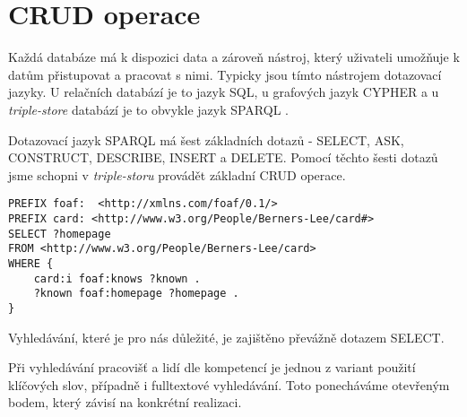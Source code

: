 \section{CRUD operace}
Každá databáze má k dispozici data a zároveň nástroj, který uživateli umožňuje k datům přistupovat a pracovat s nimi. Typicky jsou tímto nástrojem dotazovací jazyky. U relačních databází je to jazyk SQL, u grafových jazyk CYPHER a u \textit{triple-store} databází je to obvykle jazyk SPARQL \cite{SPARQL}.\par
Dotazovací jazyk SPARQL má šest základních dotazů - SELECT, ASK, CONSTRUCT, DESCRIBE, INSERT a DELETE. Pomocí těchto šesti dotazů jsme schopni v \textit{triple-storu} provádět základní CRUD operace.\par

\begin{lstlisting}[language=SPARQL, caption= Příklad SELECT dotazu v jazyce SPARQL (zdroj: \url{https://www.w3.org/2009/Talks/0615-qbe/}), captionpos=b]
PREFIX foaf:  <http://xmlns.com/foaf/0.1/>
PREFIX card: <http://www.w3.org/People/Berners-Lee/card#>
SELECT ?homepage
FROM <http://www.w3.org/People/Berners-Lee/card>
WHERE {
    card:i foaf:knows ?known .
    ?known foaf:homepage ?homepage .
}
\end{lstlisting} 
Vyhledávání, které je pro nás důležité, je zajištěno převážně dotazem SELECT.\par
Při vyhledávání pracovišť a lidí dle kompetencí je jednou z variant použití klíčových slov, případně i fulltextové vyhledávání. Toto ponecháváme otevřeným bodem, který závisí na konkrétní realizaci.


